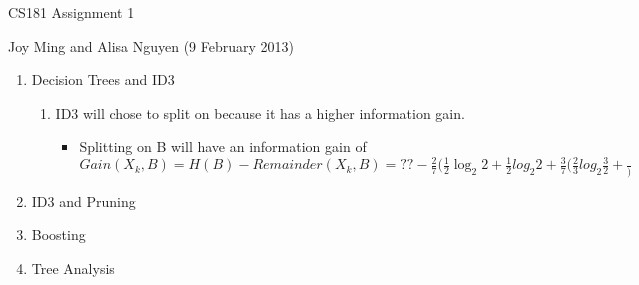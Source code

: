 \documentclass[11pt]{article}
\begin{document}
\begin{center}
\large
CS181 Assignment 1
\end{center}
Joy Ming and Alisa Nguyen (9 February 2013)\\

\begin{enumerate}
\setcounter{enumi}{0}

\item Decision Trees and ID3
\begin{enumerate}
\item ID3 will chose to split on  because it has a higher information gain.
\begin{itemize}
\item Splitting on B will have an information gain of $Gain(X_k,B)=H(B)-Remainder(X_k,B)=?? - \frac{2}{7}(\frac{1}{2}\log_2 2+\frac{1}{2}log_2 2+\frac{3}{7}(\frac{2}{3}log_2 \frac{3}{2} + \frac{})$
\end{itemize}
\end{enumerate}

\item ID3 and Pruning

\item Boosting

\item Tree Analysis

\end{enumerate}
\end{document}

